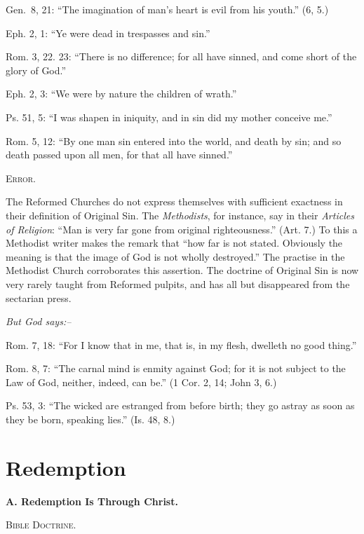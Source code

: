 \documentclass[
]{book}
\begin{document}
Gen.~8, 21: ``The imagination of man's heart is evil from his youth.'' (6, 5.)

Eph. 2, 1: ``Ye were dead in trespasses and sin.''

Rom. 3, 22. 23: ``There is no difference; for all have sinned, and come short of the glory of God.''

Eph. 2, 3: ``We were by nature the children of wrath.''

Ps. 51, 5: ``I was shapen in iniquity, and in sin did my mother conceive me.''

Rom. 5, 12: ``By one man sin entered into the world, and death by sin; and so death passed upon all men, for that all have sinned.''

\begin{center}
\textsc{Error.}
\end{center}

The Reformed Churches do not express themselves with sufficient exactness in their definition of Original Sin. The \emph{Methodists}, for instance, say in their \emph{Articles of Religion}: ``Man is very far gone from original righteousness.'' (Art. 7.) To this a Methodist writer makes the remark that ``how far is not stated. Obviously the meaning is that the image of God is not wholly destroyed.'' The practise in the Methodist Church corroborates this assertion. The doctrine of Original Sin is now very rarely taught from Reformed pulpits, and has all but disappeared from the sectarian press.

\begin{center}
\textsl{But God says:--}
\end{center}

Rom. 7, 18: ``For I know that in me, that is, in my flesh, dwelleth no good thing.''

Rom. 8, 7: ``The carnal mind is enmity against God; for it is not subject to the Law of God, neither, indeed, can be.'' (1 Cor. 2, 14; John 3, 6.)

Ps. 53, 3: ``The wicked are estranged from before birth; they go astray as soon as they be born, speaking lies.'' (Is. 48, 8.)

\section*{\texorpdfstring{Redemption}{Redemption}}\label{redemption}

\begin{center}
\textbf{A.  Redemption Is Through Christ.}

\textsc{Bible Doctrine.}
\end{center}
\end{document}
